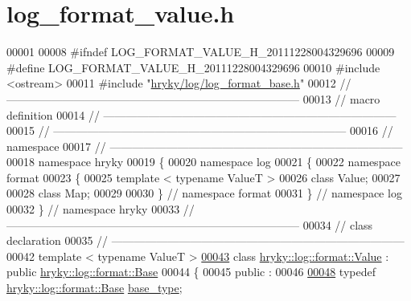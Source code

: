 \hypertarget{log__format__value_8h_source}{\section{log\-\_\-format\-\_\-value.\-h}
}

\begin{DoxyCode}
00001 
00008 \textcolor{preprocessor}{#ifndef LOG\_FORMAT\_VALUE\_H\_20111228004329696}
00009 \textcolor{preprocessor}{}\textcolor{preprocessor}{#define LOG\_FORMAT\_VALUE\_H\_20111228004329696}
00010 \textcolor{preprocessor}{}\textcolor{preprocessor}{#include <ostream>}
00011 \textcolor{preprocessor}{#include "\hyperlink{log__format__base_8h}{hryky/log/log_format_base.h}"}
00012 \textcolor{comment}{//
      ------------------------------------------------------------------------------}
00013 \textcolor{comment}{// macro definition}
00014 \textcolor{comment}{//
      ------------------------------------------------------------------------------}
00015 \textcolor{comment}{//
      ------------------------------------------------------------------------------}
00016 \textcolor{comment}{// namespace}
00017 \textcolor{comment}{//
      ------------------------------------------------------------------------------}
00018 \textcolor{keyword}{namespace }hryky
00019 \{
00020 \textcolor{keyword}{namespace }log
00021 \{
00022 \textcolor{keyword}{namespace }format
00023 \{
00025     \textcolor{keyword}{template} < \textcolor{keyword}{typename} ValueT >
00026     \textcolor{keyword}{class }Value;
00027 
00028     \textcolor{keyword}{class }Map;
00029 
00030 \} \textcolor{comment}{// namespace format}
00031 \} \textcolor{comment}{// namespace log}
00032 \} \textcolor{comment}{// namespace hryky}
00033 \textcolor{comment}{//
      ------------------------------------------------------------------------------}
00034 \textcolor{comment}{// class declaration}
00035 \textcolor{comment}{//
      ------------------------------------------------------------------------------}
00042 \textcolor{comment}{}\textcolor{keyword}{template} < \textcolor{keyword}{typename} ValueT >
\hypertarget{log__format__value_8h_source_l00043}{}\hyperlink{classhryky_1_1log_1_1format_1_1_value}{00043} \textcolor{keyword}{class }\hyperlink{classhryky_1_1log_1_1format_1_1_value}{hryky::log::format::Value} : \textcolor{keyword}{public} \hyperlink{classhryky_1_1log_1_1format_1_1_base}{hryky::log::format::Base}
00044 \{
00045 \textcolor{keyword}{public} :
00046 
\hypertarget{log__format__value_8h_source_l00048}{}\hyperlink{classhryky_1_1log_1_1format_1_1_value_aa56e3b1658ac2046f5eeaeb04b21e987}{00048}     \textcolor{keyword}{typedef} \hyperlink{classhryky_1_1log_1_1format_1_1_base}{hryky::log::format::Base} \hyperlink{classhryky_1_1log_1_1format_1_1_value_aa56e3b1658ac2046f5eeaeb04b21e987}{base_type};

\end{DoxyCode}
